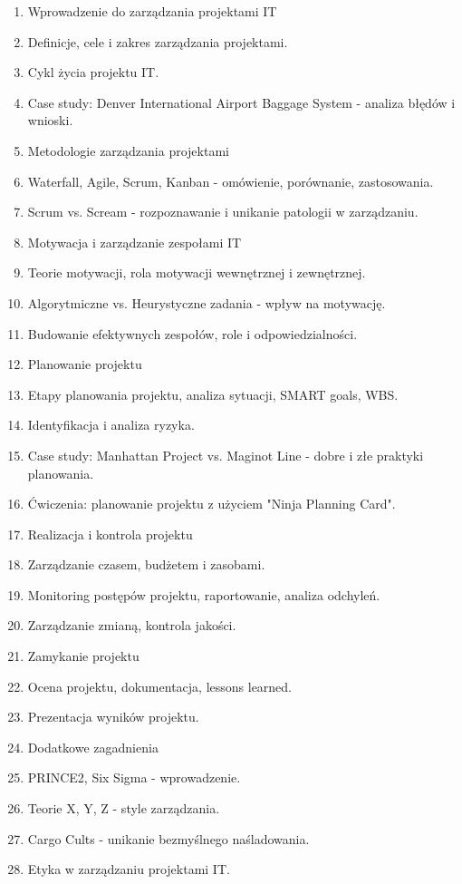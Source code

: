 \documentclass[12pt, a4paper]{article}
\begin{document}
\begin{enumerate}
  \item Wprowadzenie do zarządzania projektami IT
  \item Definicje, cele i zakres zarządzania projektami.
  \item Cykl życia projektu IT.
  \item Case study: Denver International Airport Baggage System - analiza błędów i wnioski.
  \item Metodologie zarządzania projektami
  \item Waterfall, Agile, Scrum, Kanban - omówienie, porównanie, zastosowania.
  \item Scrum vs. Scream - rozpoznawanie i unikanie patologii w zarządzaniu.
  \item Motywacja i zarządzanie zespołami IT
  \item Teorie motywacji, rola motywacji wewnętrznej i zewnętrznej.
  \item Algorytmiczne vs. Heurystyczne zadania - wpływ na motywację.
  \item Budowanie efektywnych zespołów, role i odpowiedzialności.
  \item Planowanie projektu
  \item Etapy planowania projektu, analiza sytuacji, SMART goals, WBS.
  \item Identyfikacja i analiza ryzyka.
  \item Case study: Manhattan Project vs. Maginot Line - dobre i złe praktyki planowania.
  \item Ćwiczenia: planowanie projektu z użyciem "Ninja Planning Card".
  \item Realizacja i kontrola projektu
  \item Zarządzanie czasem, budżetem i zasobami.
  \item Monitoring postępów projektu, raportowanie, analiza odchyleń.
  \item Zarządzanie zmianą, kontrola jakości.
  \item Zamykanie projektu
  \item Ocena projektu, dokumentacja, lessons learned.
  \item Prezentacja wyników projektu.
  \item Dodatkowe zagadnienia
  \item PRINCE2, Six Sigma - wprowadzenie.
  \item Teorie X, Y, Z - style zarządzania.
  \item Cargo Cults - unikanie bezmyślnego naśladowania.
  \item Etyka w zarządzaniu projektami IT.
\end{enumerate}
\end{document}
